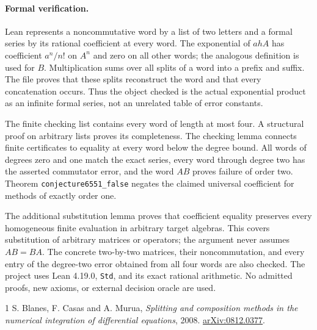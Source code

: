 \documentclass[11pt]{article}
\begin{document}
\newpage
\paragraph{Formal verification.}
Lean represents a noncommutative word by a list of two letters and a formal
series by its rational coefficient at every word. The exponential of
$ahA$ has coefficient $a^n/n!$ on $A^n$ and zero on all other words;
the analogous definition is used for $B$. Multiplication sums over all
splits of a word into a prefix and suffix. The file proves that these
splits reconstruct the word and that every concatenation occurs. Thus
the object checked is the actual exponential product as an infinite
formal series, not an unrelated table of error constants.

The finite checking list contains every word of length at most four.
A structural proof on arbitrary lists proves its completeness. The
checking lemma connects finite certificates to equality at every word
below the degree bound. All words of degrees zero and one match the exact
series, every word through degree two has the asserted commutator error,
and the word $AB$ proves failure of order two. Theorem
\texttt{conjecture6551\_false} negates the claimed universal coefficient
for methods of exactly order one.

The additional substitution lemma proves that coefficient equality
preserves every homogeneous finite evaluation in arbitrary target
algebras. This covers substitution of arbitrary matrices or operators;
the argument never assumes $AB=BA$. The concrete two-by-two matrices,
their noncommutation, and every entry of the degree-two error obtained
from all four words are also checked. The project uses Lean 4.19.0,
\texttt{Std}, and its exact rational arithmetic. No admitted proofs,
new axioms, or external decision oracle are used.
\begin{thebibliography}{1}
 S. Blanes, F. Casas and A. Murua,
\emph{Splitting and composition methods in the numerical integration
of differential equations}, 2008.
\href{https://arxiv.org/abs/0812.0377}{arXiv:0812.0377}.
\end{thebibliography}
\end{document}
